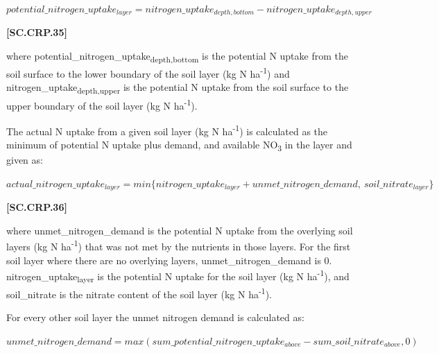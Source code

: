     \begin{center}
        \(potential\_nitrogen\_uptake_{layer}=nitrogen\_uptake_{depth,bottom}-nitrogen\_uptake_{depth,upper}\)
    \end{center}
        \vspace{0.5cm}
    
            {\raggedleft \textbf{[SC.CRP.35]}\par}
            \vspace{0.5cm}

where potential\_nitrogen\_uptake\textsubscript{depth,bottom} is the potential N uptake from the soil surface to the lower boundary of the soil layer (kg N ha\textsuperscript{-1}) and nitrogen\_uptake\textsubscript{depth,upper} is the potential N uptake from the soil surface to the upper boundary of the soil layer (kg N ha\textsuperscript{-1}). 

The actual N uptake from a given soil layer (kg N ha\textsuperscript{-1}) is calculated as the minimum of potential N uptake plus demand, and available NO\textsubscript{3} in the layer and given as:
    \vspace{0.2cm}

    \begin{center}
        \(actual\_nitrogen\_uptake_{layer}=min\{nitrogen\_uptake_{layer}+unmet\_nitrogen\_demand,\ soil\_nitrate_{layer}\}\)
    \end{center}
        \vspace{0.5cm}
    
            {\raggedleft \textbf{[SC.CRP.36]}\par}
            \vspace{0.5cm}

where unmet\_nitrogen\_demand is the potential N uptake from the overlying soil layers (kg N ha\textsuperscript{-1}) that was not met by the nutrients in those layers. For the first soil layer where there are no overlying layers, unmet\_nitrogen\_demand is 0. nitrogen\_uptake\textsubscript{layer} is the potential N uptake for the soil layer (kg N ha\textsuperscript{-1}), and soil\_nitrate is the nitrate content of the soil layer (kg N ha\textsuperscript{-1}). 

For every other soil layer the unmet nitrogen demand is calculated as:
   \vspace{0.2cm}

    \begin{center}
        \(unmet\_nitrogen\_demand=max(sum\_potential\_nitrogen\_uptake_{above}-sum\_soil\_nitrate_{above} , 0)\)
    \end{center}
        \vspace{0.5cm}
    
